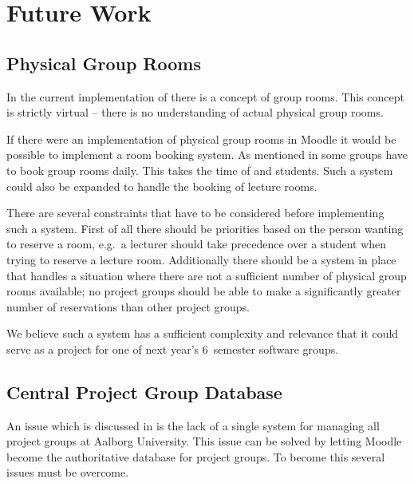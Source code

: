 \chapter{Future Work}
\label{chap:futurework}


\section{Physical Group Rooms}
\label{sec:booking}
In the current implementation of \system{} there is a concept of group rooms.
This concept is strictly virtual -- there is no understanding of actual physical group rooms.

If there were an implementation of physical group rooms in Moodle it would be possible to implement a room booking system.
As mentioned in  some groups have to book group rooms daily.
This takes the time of \admpers{} and students.
Such a system could also be expanded to handle the booking of lecture rooms.

There are several constraints that have to be considered before implementing such a system.
First of all there should be priorities based on the person wanting to reserve a room, e.g.\ a lecturer should take precedence over a student when trying to reserve a lecture room.
Additionally there should be a system in place that handles a situation where there are not a sufficient number of physical group rooms available; no project groups should be able to make a significantly greater number of reservations than other project groups.

We believe such a system has a sufficient complexity and relevance that it could serve as a project for one of next year's $6$\ths~semester software groups.

\section{Central Project Group Database}
An issue which is discussed in  is the lack of a single system for managing all project groups at Aalborg University. 
This issue can be solved by letting Moodle become the authoritative database for project groups. 
To become this several issues must be overcome. 

